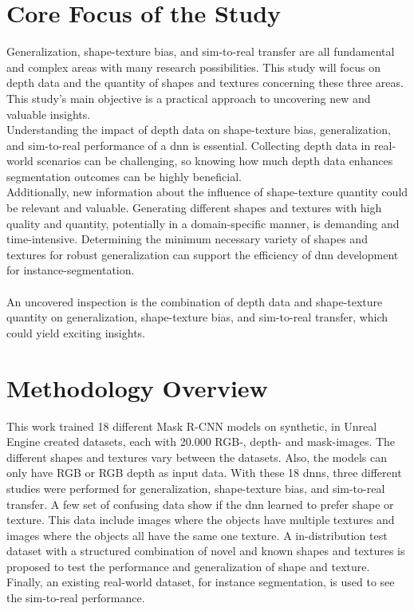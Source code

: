 	\section{Core Focus of the Study}    %
	\label{sec:core-focus-of-the-study}
		Generalization, shape-texture bias, and sim-to-real transfer are all fundamental and complex areas with many research possibilities. This study will focus on depth data and the quantity of shapes and textures concerning these three areas. This study's main objective is a practical approach to uncovering new and valuable insights.\\
		Understanding the impact of depth data on shape-texture bias, generalization, and sim-to-real performance of a \ac{dnn} is essential. Collecting depth data in real-world scenarios can be challenging, so knowing how much depth data enhances segmentation outcomes can be highly beneficial.\\
		Additionally, new information about the influence of shape-texture quantity could be relevant and valuable. Generating different shapes and textures with high quality and quantity, potentially in a domain-specific manner, is demanding and time-intensive. Determining the minimum necessary variety of shapes and textures for robust generalization can support the efficiency of \ac{dnn} development for instance-segmentation.\\
		\\
		An uncovered inspection is the combination of depth data and shape-texture quantity on generalization, shape-texture bias, and sim-to-real transfer, which could yield exciting insights.
		
	
	
	\section{Methodology Overview}
	\label{sec:methodology-overview}
		This work trained 18 different Mask R-CNN \cite{Kaiming2017} models on synthetic, in Unreal Engine \cite{Romero2022} created datasets, each with 20.000 RGB-, depth- and mask-images. The different shapes and textures vary between the datasets. Also, the models can only have RGB or RGB depth as input data. With these 18 \ac{dnn}s, three different studies were performed for generalization, shape-texture bias, and sim-to-real transfer. A few set of confusing data show if the \ac{dnn} learned to prefer shape or texture. This data include images where the objects have multiple textures and images where the objects all have the same one texture. A in-distribution test dataset with a structured combination of novel and known shapes and textures is proposed to test the performance and generalization of shape and texture.\\
		Finally, an existing real-world dataset, for instance segmentation, is used to see the sim-to-real performance.
		
